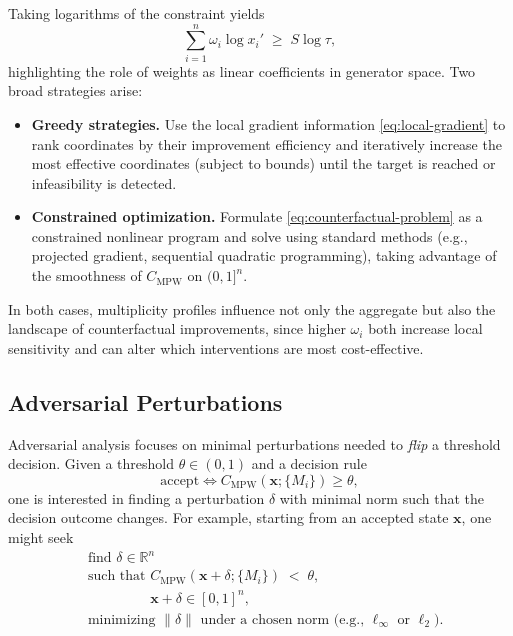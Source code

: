\documentclass[11pt]{article}
\begin{document}
Taking logarithms of the constraint yields
\[
  \sum_{i=1}^n \omega_i \log x_i' \;\ge\; S \log \tau,
\]
highlighting the role of weights as linear coefficients in generator space. Two broad strategies arise:
\begin{itemize}
  \item \textbf{Greedy strategies.} Use the local gradient information \eqref{eq:local-gradient} to rank coordinates by their improvement efficiency and iteratively increase the most effective coordinates (subject to bounds) until the target is reached or infeasibility is detected.
  \item \textbf{Constrained optimization.} Formulate \eqref{eq:counterfactual-problem} as a constrained nonlinear program and solve using standard methods (e.g., projected gradient, sequential quadratic programming), taking advantage of the smoothness of $C_{\mathrm{MPW}}$ on $(0,1]^n$.
\end{itemize}
In both cases, multiplicity profiles influence not only the aggregate but also the landscape of counterfactual improvements, since higher $\omega_i$ both increase local sensitivity and can alter which interventions are most cost-effective.

\subsection{Adversarial Perturbations}
\label{subsec:adversarial}

Adversarial analysis focuses on minimal perturbations needed to \emph{flip} a threshold decision. Given a threshold $\theta \in (0,1)$ and a decision rule
\[
  \text{accept} \iff C_{\mathrm{MPW}}(\mathbf{x};\{M_i\}) \ge \theta,
\]
one is interested in finding a perturbation $\delta$ with minimal norm such that the decision outcome changes. For example, starting from an accepted state $\mathbf{x}$, one might seek
\begin{equation}
  \begin{aligned}
    &\text{find } \delta \in \mathbb{R}^n \\
    &\text{such that } C_{\mathrm{MPW}}(\mathbf{x}+\delta;\{M_i\}) \;<\; \theta, \\
    &\phantom{\text{such that }} \mathbf{x}+\delta \in [0,1]^n, \\
    &\text{minimizing } \|\delta\| \text{ under a chosen norm (e.g., $\ell_\infty$ or $\ell_2$)}.
  \end{aligned}
  \label{eq:adversarial-problem}
\end{equation}
\end{document}
